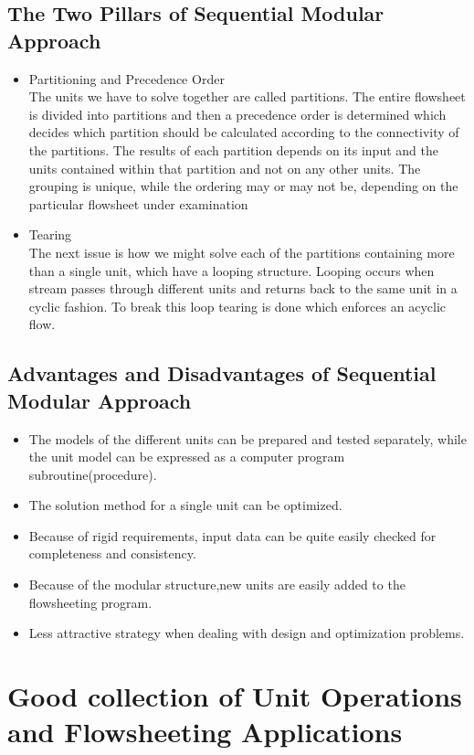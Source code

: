 \documentclass[12pt]{report}
\begin{document}
\subsection{The Two Pillars of Sequential Modular Approach}
\begin{itemize}
\item{Partitioning and Precedence Order} \\
The units we have to solve together are called partitions. The entire flowsheet is divided into partitions and then a precedence order is determined which decides which partition should be calculated according to the connectivity of the partitions. The results of each partition depends on its input and the units contained within that partition and not on any other units. The grouping is unique, while the ordering may or may not be, depending on the particular flowsheet under examination
\item{Tearing} \\
The next issue is how we might solve each of the partitions containing more than a single unit, which have a looping structure. Looping occurs when stream passes through different units and returns back to the same unit in a cyclic fashion. To break this loop tearing is done which enforces an acyclic flow.
\end{itemize}

\subsection{Advantages and Disadvantages of Sequential Modular Approach}

\begin{itemize}
\item {The models of the different units can be prepared and tested separately, while the unit model can be expressed as a computer program subroutine(procedure).}
\item{The solution method for a single unit can be optimized.}
\item{Because of rigid requirements, input data can be quite easily checked for completeness and consistency.}
\item{Because of the modular structure,new units are easily added to the flowsheeting program.}
\item{Less attractive strategy when dealing with design and optimization problems.}
\end{itemize}

\section{Good collection of Unit Operations and Flowsheeting Applications}
\end{document}
